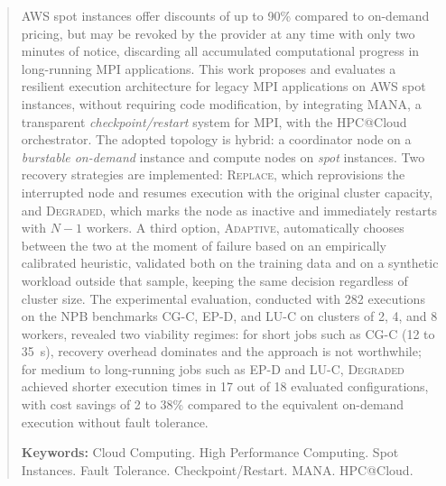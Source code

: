 \begin{abstract}
AWS spot instances offer discounts of up to 90\% compared to on-demand pricing,
but may be revoked by the provider at any time with only two minutes of notice,
discarding all accumulated computational progress in long-running MPI
applications. This work proposes and evaluates a resilient execution
architecture for legacy MPI applications on AWS spot instances, without
requiring code modification, by integrating MANA, a transparent
\textit{checkpoint/restart} system for MPI, with the HPC@Cloud orchestrator.
The adopted topology is hybrid: a coordinator node on a \textit{burstable
on-demand} instance and compute nodes on \textit{spot} instances.
Two recovery
strategies are implemented: \textsc{Replace}, which reprovisions the interrupted
node and resumes execution with the original cluster capacity, and
\textsc{Degraded}, which marks the node as inactive and immediately restarts
with $N{-}1$ workers. A third option, \textsc{Adaptive}, automatically chooses
between the two at the moment of failure based on an empirically calibrated
heuristic, validated both on the training data and on a synthetic workload
outside that sample, keeping the same decision regardless of cluster size. The
experimental evaluation, conducted with 282 executions
on the NPB benchmarks CG-C, EP-D, and LU-C on clusters of 2, 4, and 8 workers,
revealed two viability regimes: for short jobs such as CG-C (12 to 35~s),
recovery overhead dominates and the approach is not worthwhile; for medium to
long-running jobs such as EP-D and LU-C, \textsc{Degraded} achieved shorter
execution times in 17 out of 18 evaluated configurations, with cost savings of
2 to 38\% compared to the equivalent on-demand execution without fault
tolerance.

\vspace{\baselineskip}
\textbf{Keywords:} Cloud Computing. High Performance Computing. Spot Instances.
Fault Tolerance. Checkpoint/Restart. MANA. HPC@Cloud.
\end{abstract}


\listoffigures*
\listoftables*
\listofalgorithms*

\glsaddall
\listadesiglas*[7em]

\tableofcontents*%

